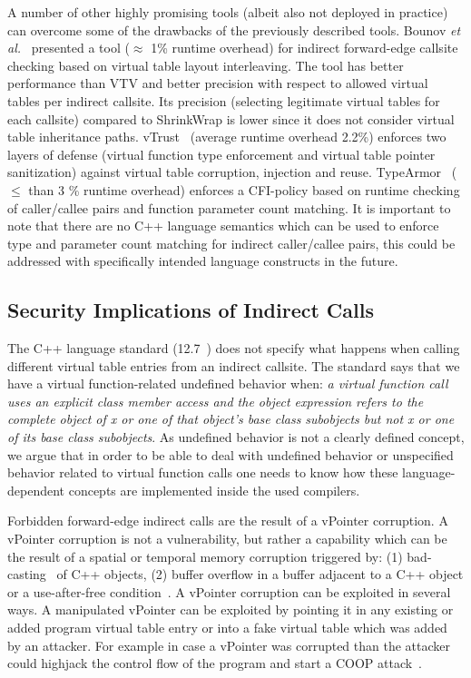 A number of other highly promising tools (albeit also not deployed in practice) can overcome some of the drawbacks of the previously described tools. Bounov \textit{et al.}~\cite{bounov:interleaving} presented a tool ($\approx$ 1\% runtime overhead)
for indirect forward-edge callsite checking based on virtual table layout interleaving. The tool has better performance than VTV and better precision with respect to allowed virtual tables per indirect callsite. Its precision (selecting legitimate virtual tables for each callsite) compared to ShrinkWrap is lower since it does not consider virtual table inheritance paths. vTrust~\cite{zhang:vtrust} (average runtime overhead 2.2\%) enforces two layers of defense (virtual function type enforcement and virtual table pointer sanitization) against virtual table corruption, injection and reuse. TypeArmor~\cite{veen:typearmor} ($\le$ than 3 \% runtime overhead) enforces a CFI-policy based on runtime checking of caller/callee pairs and function parameter count matching. It is important to note that there are no C++ language semantics which can be used to enforce type and parameter count matching for indirect caller/callee pairs, this could be addressed with specifically intended language constructs in the future.

\subsection{Security Implications of Indirect Calls}
\label{Security Implications of Forbidden Forward Indirect Calls}
The C++ language standard (12.7~\cite{iso:iecN3690}) does not specify what happens when calling different virtual table entries from an indirect callsite. The standard says that we have a virtual function-related undefined behavior when: \textit{a virtual function call uses an explicit class member access and the object expression refers to the complete object of x or one of that object's base class subobjects but not x or one of its base class subobjects}. As undefined behavior is not a clearly defined concept, we argue that in order to be able to deal with undefined behavior or unspecified behavior related to virtual function calls one needs to know how these language-dependent concepts are implemented inside the used compilers.

Forbidden forward-edge indirect calls are the result of a vPointer corruption. A vPointer corruption is not a vulnerability, but rather a capability which can be the result of a spatial or temporal memory corruption triggered by: 
(1) bad-casting~\cite{byoungyoung:typecasting} of C++ objects, 
(2) buffer overflow in a buffer adjacent to a C++ object or a use-after-free condition~\cite{schuster:coop}.
A vPointer corruption can be exploited in several ways. A manipulated vPointer can be exploited by pointing it in any existing or added program virtual table entry or into a fake virtual table which was added by an attacker. For example in case a vPointer
was corrupted than the attacker could highjack the control flow of the program and start a COOP attack~\cite{schuster:coop}.

